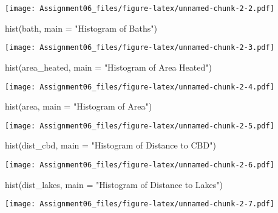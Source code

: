 \documentclass[
]{article}
\newenvironment{Shaded}{\begin{snugshade}}{\end{snugshade}}
\newcommand{\AttributeTok}[1]{\textcolor[rgb]{0.77,0.63,0.00}{#1}}
\newcommand{\FunctionTok}[1]{\textcolor[rgb]{0.00,0.00,0.00}{#1}}
\newcommand{\NormalTok}[1]{#1}
\newcommand{\StringTok}[1]{\textcolor[rgb]{0.31,0.60,0.02}{#1}}
\begin{document}
\texttt{[image: Assignment06\_files/figure-latex/unnamed-chunk-2-2.pdf]}

\begin{Shaded}
\begin{Highlighting}[]
\FunctionTok{hist}\NormalTok{(bath, }\AttributeTok{main =} \StringTok{"Histogram of Baths"}\NormalTok{)}
\end{Highlighting}
\end{Shaded}

\texttt{[image: Assignment06\_files/figure-latex/unnamed-chunk-2-3.pdf]}

\begin{Shaded}
\begin{Highlighting}[]
\FunctionTok{hist}\NormalTok{(area\_heated, }\AttributeTok{main =} \StringTok{"Histogram of Area Heated"}\NormalTok{)}
\end{Highlighting}
\end{Shaded}

\texttt{[image: Assignment06\_files/figure-latex/unnamed-chunk-2-4.pdf]}

\begin{Shaded}
\begin{Highlighting}[]
\FunctionTok{hist}\NormalTok{(area, }\AttributeTok{main =} \StringTok{"Histogram of Area"}\NormalTok{)}
\end{Highlighting}
\end{Shaded}

\texttt{[image: Assignment06\_files/figure-latex/unnamed-chunk-2-5.pdf]}

\begin{Shaded}
\begin{Highlighting}[]
\FunctionTok{hist}\NormalTok{(dist\_cbd, }\AttributeTok{main =} \StringTok{"Histogram of Distance to CBD"}\NormalTok{)}
\end{Highlighting}
\end{Shaded}

\texttt{[image: Assignment06\_files/figure-latex/unnamed-chunk-2-6.pdf]}

\begin{Shaded}
\begin{Highlighting}[]
\FunctionTok{hist}\NormalTok{(dist\_lakes, }\AttributeTok{main =} \StringTok{"Histogram of Distance to Lakes"}\NormalTok{)}
\end{Highlighting}
\end{Shaded}

\texttt{[image: Assignment06\_files/figure-latex/unnamed-chunk-2-7.pdf]}
\end{document}
